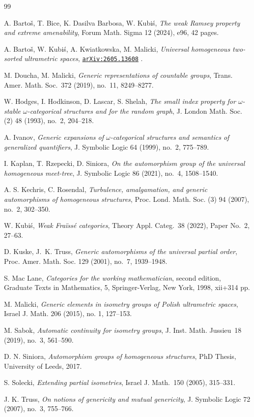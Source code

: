 \documentclass[10pt,a4paper]{article}
\theoremstyle{definition}
\theoremstyle{remark}
\newcommand \arxivlink [1]{%
    \href{https://arxiv.org/abs/#1}{\texttt{arXiv:#1}}%
}
\begin{document}
\begin{thebibliography}{99}

{\sc A. Bartoš, T. Bice, K. Dasilva Barbosa, W. Kubiś},
{\it The weak Ramsey property and extreme amenability},
Forum Math. Sigma 12 (2024), e96, 42 pages.

{\sc A. Bartoš,  W. Kubiś, A. Kwiatkowska, M. Malicki},
{\it Universal homogeneous two-sorted ultrametric spaces},
\arxivlink{2605.13608}.

{\sc M. Doucha, M. Malicki},
{\it Generic representations of countable groups},
Trans. Amer. Math. Soc.~372 (2019), no.~11, 8249–8277.

{\sc W. Hodges, I. Hodkinson, D. Lascar, S. Shelah},
{\it The small index property for $\omega$-stable $\omega$-categorical structures and for the random graph},
J. London Math. Soc. (2) 48 (1993), no.~2, 204--218.

{\sc A. Ivanov},
{\it Generic expansions of $\omega$-categorical structures and semantics of generalized
quantifiers},
J. Symbolic Logic 64 (1999), no.~2, 775--789.

{\sc I. Kaplan, T. Rzepecki, D. Siniora},
{\it On the automorphism group of the universal homogeneous meet-tree},
J. Symbolic Logic 86 (2021), no.~4, 1508--1540.

{\sc A. S. Kechris, C. Rosendal}, 
{\it Turbulence, amalgamation, and generic automorphisms of homogeneous structures}, 
Proc. Lond. Math. Soc. (3) 94 (2007), no.~2, 302--350.

{\sc W. Kubiś},
{\it Weak Fraïssé categories},
Theory Appl. Categ.~38 (2022), Paper No.~2, 27--63.

{\sc D. Kuske, J.~K. Truss},
{\it Generic automorphisms of the universal partial order},
Proc. Amer. Math. Soc. 129 (2001), no.~7, 1939--1948.

{\sc S. Mac Lane},
{\it Categories for the working mathematician},
second edition, Graduate Texts in Mathematics, 5, Springer-Verlag, New York, 1998, xii+314 pp.

{\sc M. Malicki},
{\it Generic elements in isometry groups of Polish ultrametric spaces},
Israel J. Math. 206 (2015), no. 1, 127--153.

{\sc M. Sabok},
{\it Automatic continuity for isometry groups},
J. Inst. Math. Jussieu~18 (2019), no.~3, 561–590.

{\sc D. N. Siniora},
{\it Automorphism groups of homogeneous structures},
PhD Thesis, University of Leeds, 2017.

{\sc S. Solecki},
{\it Extending partial isometries},
Israel J. Math.~150 (2005), 315--331.

{\sc J. K. Truss},
{\it On notions of genericity and mutual genericity},
J. Symbolic Logic 72 (2007), no.~3, 755--766.

\end{thebibliography}
\end{document}
